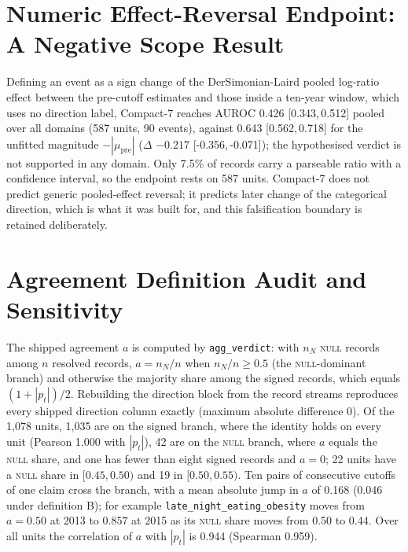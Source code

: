 \documentclass[11pt]{article}
\newcommand{\compact}{Compact-7\xspace}
\newcommand{\ci}[2]{[#1,\,#2]}
\begin{document}
\section{Numeric Effect-Reversal Endpoint: A Negative Scope Result}
\label{app:numeric}
Defining an event as a sign change of the DerSimonian-Laird pooled log-ratio effect between the
pre-cutoff estimates and those inside a ten-year window, which uses no direction label, \compact
reaches AUROC 0.426 \ci{0.343}{0.512} pooled over all domains (587 units, 90 events), against 0.643
\ci{0.562}{0.718} for the unfitted magnitude $-|\mu_{\text{pre}}|$ ($\Delta$ $-0.217$
\ci{-0.356}{-0.071}); the hypothesised verdict is not supported in any domain. Only 7.5\% of
records carry a parseable ratio with a confidence interval, so the endpoint rests on 587 units.
\compact does not predict generic pooled-effect reversal; it predicts later change of the
categorical direction, which is what it was built for, and this falsification boundary is retained
deliberately.

\section{Agreement Definition Audit and Sensitivity}
\label{app:agreement}
The shipped agreement $a$ is computed by \texttt{agg\_verdict}: with $n_N$ \textsc{null} records
among $n$ resolved records, $a=n_N/n$ when $n_N/n\ge0.5$ (the \textsc{null}-dominant branch) and
otherwise the majority share among the signed records, which equals $(1+|p_t|)/2$. Rebuilding the
direction block from the record streams reproduces every shipped direction column
exactly (maximum absolute difference 0). Of the 1{,}078 units, 1{,}035 are on the signed
branch, where the identity holds on every unit (Pearson 1.000 with $|p_t|$), 42 are on the
\textsc{null} branch, where $a$ equals the \textsc{null} share, and one has fewer than eight signed
records and $a=0$; 22 units have a \textsc{null} share in $[0.45,0.50)$ and 19 in $[0.50,0.55)$.
Ten pairs of consecutive cutoffs of one claim cross the branch, with a mean absolute jump in $a$ of
0.168 (0.046 under definition B); for example \texttt{late\_night\_eating\_obesity} moves from
$a=0.50$ at 2013 to $0.857$ at 2015 as its \textsc{null} share moves from 0.50 to 0.44. Over all
units the correlation of $a$ with $|p_t|$ is 0.944 (Spearman 0.959).
\end{document}
